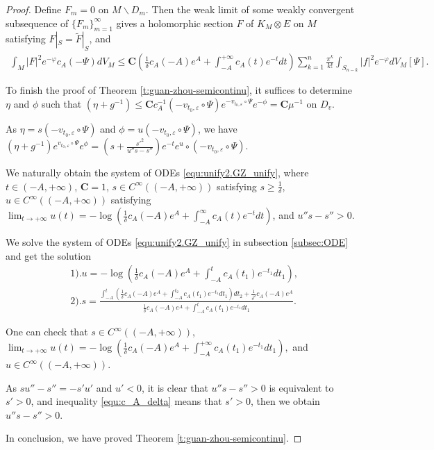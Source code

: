 \begin{proof}
Define $F_m=0$ on $M\backslash D_m$. Then the weak limit of some
weakly convergent subsequence of $\{F_m\}_{m=1}^\infty$ gives a
holomorphic section $F$ of $K_{M}\otimes E$ on $M$ satisfying
$F|_{S}=\tilde{F}|_{S}$, and
\begin{equation}
\begin{split}
\int_{ M}|F|^{2}e^{-\varphi}c_{A}(-\Psi)dV_{M}
\leq\mathbf{C}(\frac{1}{\delta}c_{A}(-A)e^{A}+
\int_{-A}^{+\infty}c_{A}(t)e^{-t}dt)\sum_{k=1}^{n}\frac{\pi^{k}}{k!}\int_{S_{n-k}}|f|^{2}e^{-\varphi}dV_{M}[\Psi].
\end{split}
\end{equation}

To finish the proof of Theorem \ref{t:guan-zhou-semicontinu}, it
suffices to determine $\eta$ and $\phi$ such that $(\eta+g^{-1})\leq
\mathbf{C}c^{-1}_{A}(-v_{t_0,\varepsilon}\circ\Psi)e^{-v_{t_0,\varepsilon}\circ\Psi}e^{-\phi}=\mathbf{C}\mu^{-1}$
on $D_v$.

As $\eta=s(-v_{t_0,\varepsilon}\circ\Psi)$ and
$\phi=u(-v_{t_0,\varepsilon}\circ\Psi)$, we have $(\eta+g^{-1})
e^{v_{t_0,\varepsilon}\circ\Psi}e^{\phi}=(s+\frac{s'^{2}}{u''s-s''})e^{-t}e^{u}\circ(-v_{t_0,\varepsilon}\circ\Psi)$.

We naturally obtain the system of ODEs \ref{equ:unify2.GZ_unify},
where $t\in(-A,+\infty)$, $\mathbf{C}=1$, $s\in
C^{\infty}((-A,+\infty))$ satisfying $s\geq \frac{1}{\delta}$, $u\in
C^{\infty}((-A,+\infty))$ satisfying
$\lim_{t\to+\infty}u(t)=-\log(\frac{1}{\delta}c_{A}(-A)e^{A}+\int_{-A}^{\infty}c_{A}(t)e^{-t}dt)$,
and $u''s-s''>0$.

We solve the system of ODEs \ref{equ:unify2.GZ_unify} in subsection
\ref{subsec:ODE} and get the solution
\begin{equation}
\begin{split}
&1).u=-\log(\frac{1}{\delta}c_{A}(-A)e^{A}+\int_{-A}^{t}c_{A}(t_{1})e^{-t_{1}}dt_{1}),
\\&
2).s=\frac{\int_{-A}^{t}(\frac{1}{\delta}c_{A}(-A)e^{A}+\int_{-A}^{t_{2}}c_{A}(t_{1})e^{-t_{1}}dt_{1})dt_{2}
+\frac{1}{\delta^{2}}c_{A}(-A)e^{A}}
{\frac{1}{\delta}c_{A}(-A)e^{A}+\int_{-A}^{t}c_{A}(t_{1})e^{-t_{1}}dt_{1}}.
\end{split}
\end{equation}

One can check that $s\in C^{\infty}((-A,+\infty))$,
$\lim_{t\to+\infty}u(t)=-\log(\frac{1}{\delta}c_{A}(-A)e^{A}+\int_{-A}^{+\infty}c_{A}(t_{1})e^{-t_{1}}dt_{1}),$
and $u\in C^{\infty}((-A,+\infty))$.

As $su''-s''=-s'u'$ and $u'<0$, it is clear that $u''s-s''>0$ is
equivalent to $s'>0$, and inequality \ref{equ:c_A_delta} means that
$s'>0$, then we obtain $u''s-s''>0$.

In conclusion, we have proved Theorem \ref{t:guan-zhou-semicontinu}.
\end{proof}

